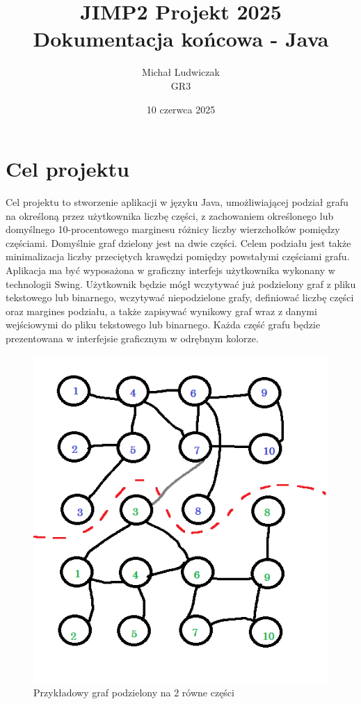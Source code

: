 \documentclass{article}
\title{\Huge JIMP2 Projekt 2025 \\ {\huge Dokumentacja końcowa - Java}}
\author{Michał Ludwiczak \\ GR3}
\date{10 czerwca 2025}
\begin{document}
\maketitle

\tableofcontents



\section{Cel projektu}

    Cel projektu to stworzenie aplikacji w języku Java, umożliwiającej podział grafu na określoną przez użytkownika liczbę części, z zachowaniem określonego lub domyślnego 10-procentowego marginesu różnicy liczby wierzchołków pomiędzy częściami. Domyślnie graf dzielony jest na dwie części. Celem podziału jest także minimalizacja liczby przeciętych krawędzi pomiędzy powstałymi częściami grafu. 
    Aplikacja ma być wyposażona w graficzny interfejs użytkownika wykonany w technologii Swing. Użytkownik będzie mógł wczytywać już podzielony graf z pliku tekstowego lub binarnego, wczytywać niepodzielone grafy, definiować liczbę części oraz margines podziału, a także zapisywać wynikowy graf wraz z danymi wejściowymi do pliku tekstowego lub binarnego. 
    Każda część grafu będzie prezentowana w interfejsie graficznym w odrębnym kolorze.
    
    \begin{figure}[H]
        \centering
        \includegraphics[width=0.75\linewidth]{img/graph.png}
        \caption{Przykładowy graf podzielony na 2 równe części}
        \label{fig:graph}
    \end{figure}
\end{document}
